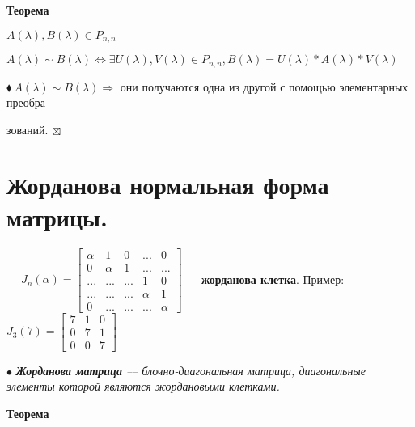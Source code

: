 \documentclass[a4paper, 12pt]{report}
\begin{document}
	\textbf{Теорема}
	
	$A(\lambda), B(\lambda) \in P_{n,n}$
	
	$A(\lambda) \sim B(\lambda) \Longleftrightarrow \exists U(\lambda), V(\lambda) \in P_{n,n}, B(\lambda) = U(\lambda) * A(\lambda) * V(\lambda)$
	\par\bigskip
	$\blacklozenge\ A(\lambda) \sim B(\lambda) \Longrightarrow$ они получаются одна из другой с помощью элементарных преобра-
	
	\quad зований. \quad $\boxtimes$
	
	
	
	
	
	
	
	
	\section{Жорданова нормальная форма матрицы.}
	$\quad \; J_n(\alpha) = \begin{bmatrix}
		\alpha & 1 & 0 & ... & 0 \\
		0 & \alpha & 1 & ... & ... \\
		... & ... & ... & 1 & 0 \\
		... & ... & ... & \alpha & 1 \\
		0 & ... & ... & ... & \alpha \end{bmatrix} 
	$ --- \textbf{жорданова клетка}. Пример: $ J_3(7) = \begin{bmatrix} 7 & 1 & 0 \\ 0 & 7 & 1 \\ 0 & 0 & 7 \end{bmatrix}$
	\par\bigskip
	$\bullet$ \textit{\textbf{Жорданова матрица} –-- блочно-диагональная матрица, диагональные элементы которой являются жордановыми клетками.}
	\par\bigskip
	\textbf{Теорема}
	
\end{document}
